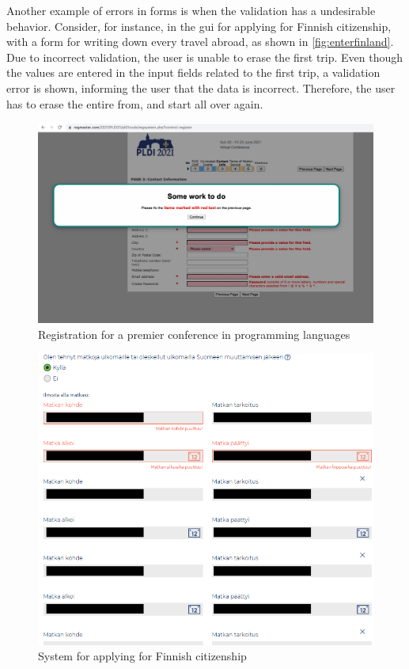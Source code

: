 Another example of errors in forms is when the validation has a undesirable behavior. Consider, for instance, in the \gls{gui} for applying for Finnish citizenship, with a form for writing down every travel abroad, as shown in \autoref{fig:enterfinland}. Due to incorrect validation, the user is unable to erase the first trip. Even though the values are entered in the input fields related to the first trip, a validation error is shown, informing the user that the data is incorrect. Therefore, the user has to erase the entire from, and start all over again.
\begin{figure}
    \centering
    \includegraphics[scale=0.2, frame]{figures/PLDI.jpg}
    \caption{Registration for a premier conference in programming languages}
    \label{fig:PLDI}
\end{figure}


\begin{figure}
    \centering
    \includegraphics[scale=0.35, frame]{figures/enterfinland-ui-citizenship-cant-remove-first-trip.png}
    \caption{System for applying for Finnish citizenship}
    \label{fig:enterfinland}
\end{figure}

